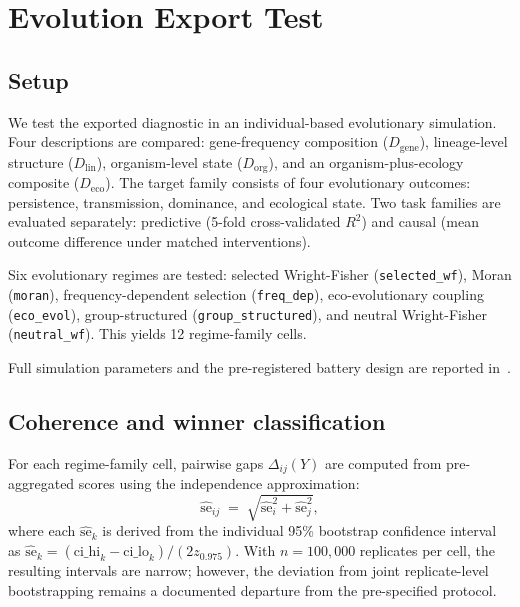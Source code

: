 \documentclass[11pt]{article}
\begin{document}

\section{Evolution Export Test}
\label{sec:export}

\subsection{Setup}

We test the exported diagnostic in an individual-based evolutionary
simulation.
Four descriptions are compared:
gene-frequency composition ($D_\mathrm{gene}$),
lineage-level structure ($D_\mathrm{lin}$),
organism-level state ($D_\mathrm{org}$),
and an organism-plus-ecology composite ($D_\mathrm{eco}$).
The target family consists of four evolutionary outcomes:
persistence, transmission, dominance, and ecological state.
Two task families are evaluated separately:
predictive (5-fold cross-validated $R^2$) and causal
(mean outcome difference under matched interventions).

Six evolutionary regimes are tested:
selected Wright-Fisher (\texttt{selected\_wf}),
Moran (\texttt{moran}),
frequency-dependent selection (\texttt{freq\_dep}),
eco-evolutionary coupling (\texttt{eco\_evol}),
group-structured (\texttt{group\_structured}),
and neutral Wright-Fisher (\texttt{neutral\_wf}).
This yields 12 regime-family cells.

Full simulation parameters and the pre-registered battery design are
reported in~\citet{bhatia2026evolution}.

\subsection{Coherence and winner classification}

For each regime-family cell, pairwise gaps $\Delta_{ij}(Y)$ are computed
from pre-aggregated scores using the independence approximation:
\begin{equation}
    \widehat{\mathrm{se}}_{ij}
    \;=\;
    \sqrt{\widehat{\mathrm{se}}_i^2 + \widehat{\mathrm{se}}_j^2},
\end{equation}
where each $\widehat{\mathrm{se}}_k$ is derived from the individual 95\%
bootstrap confidence interval as
$\widehat{\mathrm{se}}_k = (\mathrm{ci\_hi}_k - \mathrm{ci\_lo}_k) /
(2 z_{0.975})$.
With $n = 100{,}000$ replicates per cell, the resulting intervals are
narrow; however, the deviation from joint replicate-level bootstrapping
remains a documented departure from the pre-specified protocol.
\end{document}
